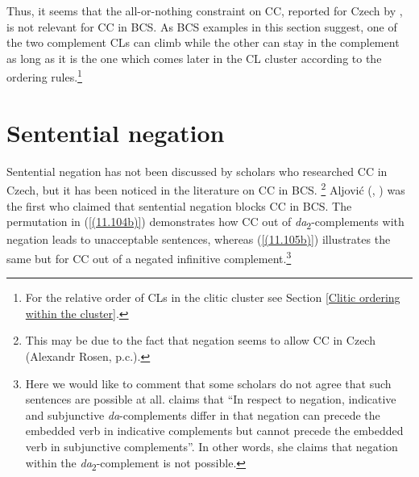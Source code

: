 \noindent Thus, it seems that the all-or-nothing constraint on CC, reported for Czech by \citet{Rezac05}, is not relevant for CC in BCS. As BCS examples in this section suggest, one of the two complement CLs can climb while the other can stay in the complement as long as it is the one which comes later in the CL cluster according to the ordering rules.\footnote{For the relative order of CLs in the clitic cluster see Section \ref{Clitic ordering within the cluster}.}

\section{Sentential negation}
\label{Sentential negation}
Sentential negation has not been discussed by scholars who researched CC in Czech, but it has been noticed in the literature on CC in BCS. \footnote{This may be due to the fact that negation seems to allow CC in Czech (Alexandr Rosen, p.c.).} Aljović (\citeyear[3f]{Aljovic04}, \citeyear[6]{Aljovic05}) was the first who claimed that sentential negation blocks CC in BCS. The permutation in (\ref{(11.104b)}) demonstrates how CC out of \textit{da}\textsubscript{2}-complements with negation leads to unacceptable sentences, whereas (\ref{(11.105b)}) illustrates the same but for CC out of a negated infinitive complement.\footnote{Here we would like to comment that some scholars do not agree that such sentences are possible at all. \citet[168]{Todorovic12} claims that “In respect to negation, indicative and subjunctive \textit{da}-complements differ in that negation can precede the embedded verb in indicative complements but cannot precede the embedded verb in subjunctive complements”. In other words, she claims that negation within the \textit{da}\textsubscript{2}-complement is not possible.}

